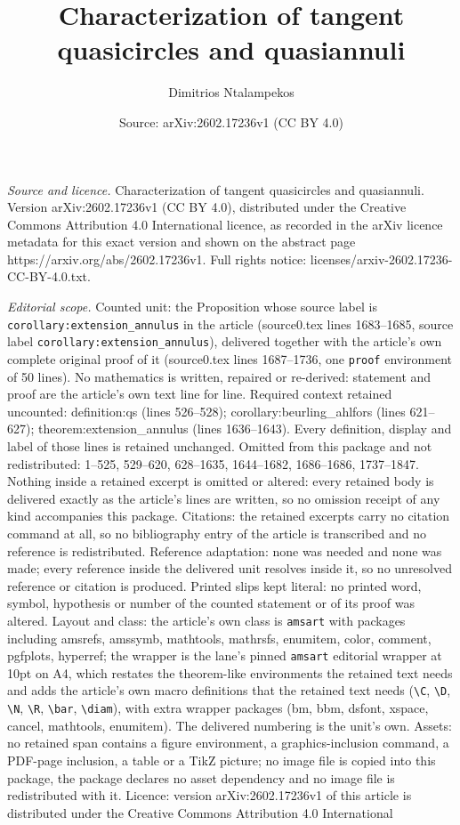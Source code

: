 \documentclass[10pt,a4paper]{amsart}
\title[Characterization of tangent quasicircles and quasiannuli]{Characterization of tangent quasicircles and quasiannuli}
\author{Dimitrios Ntalampekos}
\date{Source: arXiv:2602.17236v1 (CC BY 4.0)}
\begin{document}
\maketitle

\noindent\emph{Source and licence.} Characterization of tangent quasicircles and quasiannuli. Version arXiv:2602.17236v1 (CC BY 4.0), distributed under the Creative Commons Attribution 4.0 International licence, as recorded in the arXiv licence metadata for this exact version and shown on the abstract page https://arxiv.org/abs/2602.17236v1. Full rights notice: licenses/arxiv-2602.17236-CC-BY-4.0.txt.\par\smallskip

\noindent\textit{Editorial scope.} Counted unit: the Proposition whose source label is \texttt{corollary:extension\_annulus} in the article (source0.tex lines 1683--1685, source label \texttt{corollary:extension\_annulus}), delivered together with the article's own complete original proof of it (source0.tex lines 1687--1736, one \texttt{proof} environment of 50 lines). No mathematics is written, repaired or re-derived: statement and proof are the article's own text line for line. Required context retained uncounted: definition:qs (lines 526--528); corollary:beurling\_ahlfors (lines 621--627); theorem:extension\_annulus (lines 1636--1643). Every definition, display and label of those lines is retained unchanged. Omitted from this package and not redistributed: 1--525, 529--620, 628--1635, 1644--1682, 1686--1686, 1737--1847. Nothing inside a retained excerpt is omitted or altered: every retained body is delivered exactly as the article's lines are written, so no omission receipt of any kind accompanies this package. Citations: the retained excerpts carry no citation command at all, so no bibliography entry of the article is transcribed and no reference is redistributed. Reference adaptation: none was needed and none was made; every reference inside the delivered unit resolves inside it, so no unresolved reference or citation is produced. Printed slips kept literal: no printed word, symbol, hypothesis or number of the counted statement or of its proof was altered. Layout and class: the article's own class is \texttt{amsart} with packages including amsrefs, amssymb, mathtools, mathrsfs, enumitem, color, comment, pgfplots, hyperref; the wrapper is the lane's pinned \texttt{amsart} editorial wrapper at 10pt on A4, which restates the theorem-like environments the retained text needs and adds the article's own macro definitions that the retained text needs (\texttt{\textbackslash C}, \texttt{\textbackslash D}, \texttt{\textbackslash N}, \texttt{\textbackslash R}, \texttt{\textbackslash bar}, \texttt{\textbackslash diam}), with extra wrapper packages (bm, bbm, dsfont, xspace, cancel, mathtools, enumitem). The delivered numbering is the unit's own. Assets: no retained span contains a figure environment, a graphics-inclusion command, a PDF-page inclusion, a table or a TikZ picture; no image file is copied into this package, the package declares no asset dependency and no image file is redistributed with it. Licence: version arXiv:2602.17236v1 of this article is distributed under the Creative Commons Attribution 4.0 International 
\end{document}
